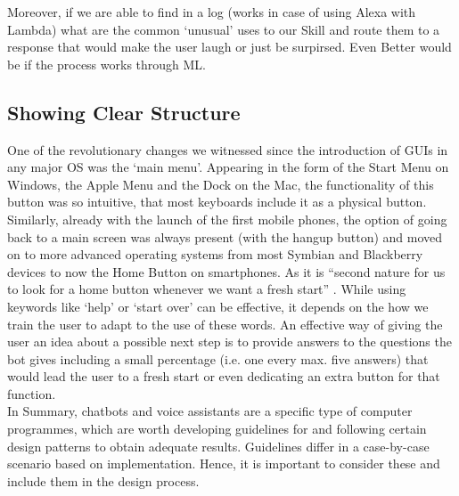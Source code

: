 Moreover, if we are able to find in a log (works in case of using Alexa with Lambda) what are the common `unusual' uses to our Skill and route them to a response that would make the user laugh or just be surpirsed. Even Better would be if the process works through ML.


\subsection*{Showing Clear Structure}
One of the revolutionary changes we witnessed since the introduction of GUIs in any major OS was the `main menu'. Appearing in the form of the Start Menu on Windows, the Apple Menu and the Dock on the Mac, the functionality of this button was so intuitive, that most keyboards include it as a physical button. Similarly, already with the launch of the first mobile phones, the option of going back to a main screen was always present (with the hangup button) and moved on to more advanced operating systems from most Symbian and Blackberry devices to now the Home Button on smartphones. As it is ``second nature for us to look for a home button whenever we want a fresh start'' \cite{uxbot}. While using keywords like `help' or `start over' can be effective, it depends on the how we train the user to adapt to the use of these words.
An effective way of giving the user an idea about a possible next step is to provide answers to the questions the bot gives including a small percentage (i.e. one every max. five answers) that would lead the user to a fresh start or even dedicating an extra button for that function.
\\


In Summary, chatbots and voice assistants are a specific type of computer programmes, which are worth developing guidelines for and following certain design patterns to obtain adequate results. Guidelines differ in a case-by-case scenario based on implementation. Hence, it is important to consider these and include them in the design process.
